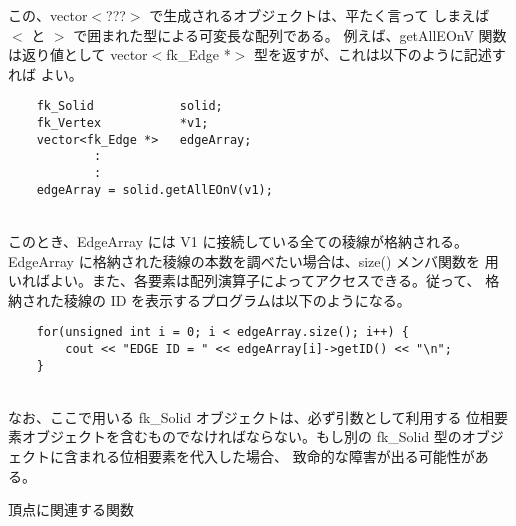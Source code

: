この、vector\(<\)???\(>\) で生成されるオブジェクトは、平たく言って
しまえば \(<\) と \(>\) で囲まれた型による可変長な配列である。
例えば、getAllEOnV 関数は返り値として
vector\(<\)fk\_Edge *\(>\) 型を返すが、これは以下のように記述すれば
よい。
\\
\begin{breakbox}
\begin{verbatim}
    fk_Solid            solid;
    fk_Vertex           *v1;
    vector<fk_Edge *>   edgeArray;
            :
            :
    edgeArray = solid.getAllEOnV(v1);
\end{verbatim}
\end{breakbox}
~ \\
このとき、EdgeArray には V1 に接続している全ての稜線が格納される。
EdgeArray に格納された稜線の本数を調べたい場合は、size() メンバ関数を
用いればよい。また、各要素は配列演算子によってアクセスできる。従って、
格納された稜線の ID を表示するプログラムは以下のようになる。
\\
\begin{breakbox}
\begin{verbatim}
    for(unsigned int i = 0; i < edgeArray.size(); i++) {
        cout << "EDGE ID = " << edgeArray[i]->getID() << "\n";
    }
\end{verbatim}
\end{breakbox}
~ \\
なお、ここで用いる fk\_Solid オブジェクトは、必ず引数として利用する
位相要素オブジェクトを含むものでなければならない。もし別の
fk\_Solid 型のオブジェクトに含まれる位相要素を代入した場合、
致命的な障害が出る可能性がある。
\begin{center}
{\large 頂点に関連する関数}
\end{center}
